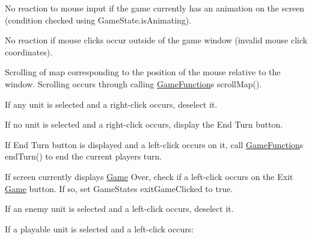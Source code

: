 \begin{DoxyItemize}
\item No reaction to mouse input if the game currently has an animation on the screen (condition checked using Game\+State.\+is\+Animating). ~\newline

\item No reaction if mouse clicks occur outside of the game window (invalid mouse click coordinates). ~\newline

\item Scrolling of map corresponding to the position of the mouse relative to the window. Scrolling occurs through calling \hyperlink{class_controller_1_1_game_function}{Game\+Function}\textquotesingle{}s scroll\+Map(). ~\newline

\item If any unit is selected and a right-\/click occurs, deselect it. ~\newline

\item If no unit is selected and a right-\/click occurs, display the \textquotesingle{}End Turn\textquotesingle{} button. ~\newline

\item If \textquotesingle{}End Turn\textquotesingle{} button is displayed and a left-\/click occurs on it, call \hyperlink{class_controller_1_1_game_function}{Game\+Function}\textquotesingle{}s end\+Turn() to end the current player\textquotesingle{}s turn. ~\newline

\item If screen currently displays \textquotesingle{}\hyperlink{class_controller_1_1_game}{Game} Over\textquotesingle{}, check if a left-\/click occurs on the \textquotesingle{}Exit \hyperlink{class_controller_1_1_game}{Game}\textquotesingle{} button. If so, set Game\+State\textquotesingle{}s exit\+Game\+Clicked to true. ~\newline

\item If an enemy unit is selected and a left-\/click occurs, deselect it. ~\newline

\item If a playable unit is selected and a left-\/click occurs\+: ~\newline


\end{DoxyItemize}
